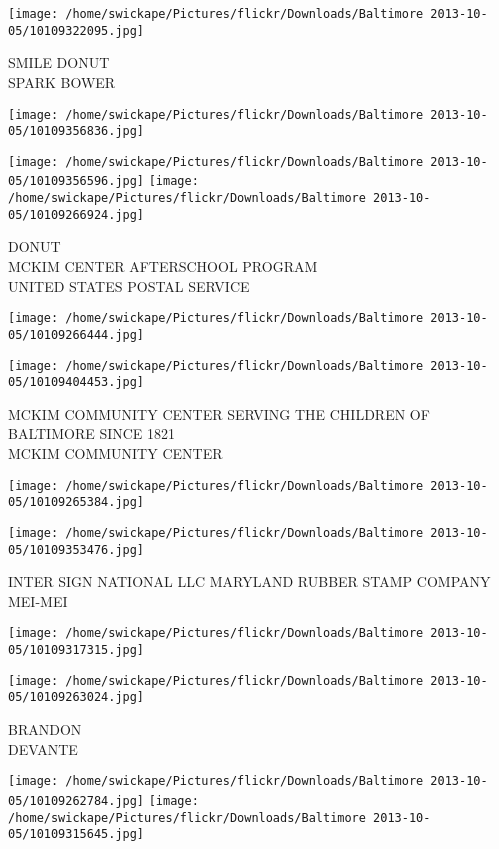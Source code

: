 \documentclass[10pt,letterpaper]{article}
\begin{document}
\vspace{0.25in}
\texttt{[image: /home/swickape/Pictures/flickr/Downloads/Baltimore 2013-10-05/10109322095.jpg]}

SMILE DONUT\\
SPARK BOWER
\pagebreak

\texttt{[image: /home/swickape/Pictures/flickr/Downloads/Baltimore 2013-10-05/10109356836.jpg]}

\vspace{0.25in}
\texttt{[image: /home/swickape/Pictures/flickr/Downloads/Baltimore 2013-10-05/10109356596.jpg]}
\texttt{[image: /home/swickape/Pictures/flickr/Downloads/Baltimore 2013-10-05/10109266924.jpg]}

DONUT\\
MCKIM CENTER AFTERSCHOOL PROGRAM\\
UNITED STATES POSTAL SERVICE
\pagebreak

\texttt{[image: /home/swickape/Pictures/flickr/Downloads/Baltimore 2013-10-05/10109266444.jpg]}

\vspace{0.25in}
\texttt{[image: /home/swickape/Pictures/flickr/Downloads/Baltimore 2013-10-05/10109404453.jpg]}

MCKIM COMMUNITY CENTER SERVING THE CHILDREN OF BALTIMORE SINCE 1821\\
MCKIM COMMUNITY CENTER
\pagebreak

\texttt{[image: /home/swickape/Pictures/flickr/Downloads/Baltimore 2013-10-05/10109265384.jpg]}

\vspace{0.25in}
\texttt{[image: /home/swickape/Pictures/flickr/Downloads/Baltimore 2013-10-05/10109353476.jpg]}

INTER SIGN NATIONAL LLC MARYLAND RUBBER STAMP COMPANY\\
MEI{-}MEI
\pagebreak

\texttt{[image: /home/swickape/Pictures/flickr/Downloads/Baltimore 2013-10-05/10109317315.jpg]}

\vspace{0.25in}
\texttt{[image: /home/swickape/Pictures/flickr/Downloads/Baltimore 2013-10-05/10109263024.jpg]}

BRANDON\\
DEVANTE
\pagebreak

\texttt{[image: /home/swickape/Pictures/flickr/Downloads/Baltimore 2013-10-05/10109262784.jpg]}
\texttt{[image: /home/swickape/Pictures/flickr/Downloads/Baltimore 2013-10-05/10109315645.jpg]}
\end{document}
